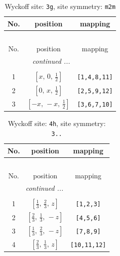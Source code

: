\documentclass[fleqn,8pt]{jsarticle}
\begin{document}
\begin{longtable}{ccc}
\caption{Wyckoff site: {\tt 3g}, site symmetry: {\tt m2m}}
 \\
 \hline \hline
No. & position & mapping \\ \hline \endfirsthead

\multicolumn{2}{l}{\tablename\ \thetable{}} \\
 \hline \hline
No. & position & mapping \\ \hline \endhead

 \hline \hline
\multicolumn{2}{r}{\footnotesize\it continued ...} \\ \endfoot

 \hline \hline
\multicolumn{2}{r}{} \\ \endlastfoot

1 & $\left[ x,\, 0,\, \frac{1}{2} \right]$ & {\tt [1,4,8,11]} \\ \hline
2 & $\left[ 0,\, x,\, \frac{1}{2} \right]$ & {\tt [2,5,9,12]} \\ \hline
3 & $\left[ - x,\, - x,\, \frac{1}{2} \right]$ & {\tt [3,6,7,10]} \\
\end{longtable}
\renewcommand{\arraystretch}{1.2}
\begin{longtable}{ccc}
\caption{Wyckoff site: {\tt 4h}, site symmetry: {\tt 3..}}
 \\
 \hline \hline
No. & position & mapping \\ \hline \endfirsthead

\multicolumn{2}{l}{\tablename\ \thetable{}} \\
 \hline \hline
No. & position & mapping \\ \hline \endhead

 \hline \hline
\multicolumn{2}{r}{\footnotesize\it continued ...} \\ \endfoot

 \hline \hline
\multicolumn{2}{r}{} \\ \endlastfoot

1 & $\left[ \frac{1}{3},\, \frac{2}{3},\, z \right]$ & {\tt [1,2,3]} \\ \hline
2 & $\left[ \frac{2}{3},\, \frac{1}{3},\, - z \right]$ & {\tt [4,5,6]} \\ \hline
3 & $\left[ \frac{1}{3},\, \frac{2}{3},\, - z \right]$ & {\tt [7,8,9]} \\ \hline
4 & $\left[ \frac{2}{3},\, \frac{1}{3},\, z \right]$ & {\tt [10,11,12]} \\
\end{longtable}
\end{document}
